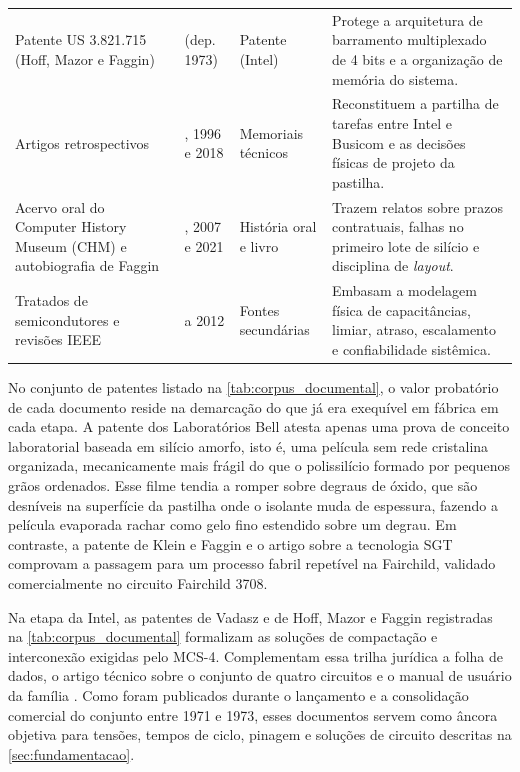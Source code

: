 \begin{table}[!t]
\begin{tabularx}{\textwidth}{>{\raggedright\arraybackslash}p{5.1cm} >{\centering\arraybackslash}p{2.3cm} >{\raggedright\arraybackslash}p{2.9cm} >{\raggedright\arraybackslash}X}
Patente US 3.821.715 (Hoff, Mazor e Faggin) \cite{faggin1974patent} & 1974 (dep. 1973) & Patente (Intel) & Protege a arquitetura de barramento multiplexado de 4 bits e a organização de memória do sistema. \\
Artigos retrospectivos \cite{noyce1981, faggin1996, faggin2018howwemade} & 1981, 1996 e 2018 & Memoriais técnicos & Reconstituem a partilha de tarefas entre Intel e Busicom e as decisões físicas de projeto da pastilha. \\
Acervo oral do Computer History Museum (CHM) e autobiografia de Faggin \cite{chm2004faggin, chm2007panel, faggin2021} & 2004, 2007 e 2021 & História oral e livro & Trazem relatos sobre prazos contratuais, falhas no primeiro lote de silício e disciplina de \textit{layout}. \\
Tratados de semicondutores e revisões IEEE \cite{morton1958, mead1980, sze2006, weste2010, cavin2012} & 1958 a 2012 & Fontes secundárias & Embasam a modelagem física de capacitâncias, limiar, atraso, escalamento e confiabilidade sistêmica. \\
\bottomrule
\end{tabularx}
\end{table}

No conjunto de patentes listado na \cref{tab:corpus_documental}, o valor probatório de cada documento reside na demarcação do que já era exequível em fábrica em cada etapa. A patente dos Laboratórios Bell \cite{kerwin1969patent} atesta apenas uma prova de conceito laboratorial baseada em silício amorfo, isto é, uma película sem rede cristalina organizada, mecanicamente mais frágil do que o polissilício formado por pequenos grãos ordenados. Esse filme tendia a romper sobre degraus de óxido, que são desníveis na superfície da pastilha onde o isolante muda de espessura, fazendo a película evaporada rachar como gelo fino estendido sobre um degrau. Em contraste, a patente de Klein e Faggin \cite{klein1972patent} e o artigo sobre a tecnologia SGT \cite{faggin1970} comprovam a passagem para um processo fabril repetível na Fairchild, validado comercialmente no circuito Fairchild 3708.

Na etapa da Intel, as patentes de Vadasz e de Hoff, Mazor e Faggin registradas na \cref{tab:corpus_documental} \cite{vadasz1972patent, faggin1974patent} formalizam as soluções de compactação e interconexão exigidas pelo MCS-4. Complementam essa trilha jurídica a folha de dados, o artigo técnico sobre o conjunto de quatro circuitos e o manual de usuário da família \cite{intel1971datasheet, faggin1972fourchip, intel1973mcs4}. Como foram publicados durante o lançamento e a consolidação comercial do conjunto entre 1971 e 1973, esses documentos servem como âncora objetiva para tensões, tempos de ciclo, pinagem e soluções de circuito descritas na \cref{sec:fundamentacao}.

